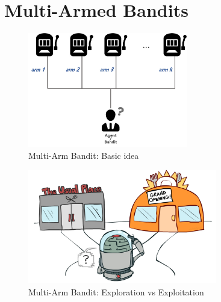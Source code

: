 \chapter{Multi-Armed Bandits \cite{medium-numsmt2-rl-ch2-part-1,umich-teneket-MAB,arxiv-1904.07272}}\label{Multi-Arm Bandits}

\begin{table}[H]
    \centering
    \begin{minipage}{0.45\linewidth}
        \begin{figure}[H]
            \centering
            \includegraphics[height=5cm]{Pictures/deep-reinforcement-learning/multi-arm-bandit-1.jpg}
            \caption{Multi-Arm Bandit: Basic idea}
        \end{figure}
    \end{minipage}
    \hfill
    \begin{minipage}{0.45\linewidth}
        \begin{figure}[H]
            \centering
            \includegraphics[height=5cm]{Pictures/deep-reinforcement-learning/multi-arm-bandit-2.jpg}
            \caption{Multi-Arm Bandit: Exploration vs Exploitation}
        \end{figure}
    \end{minipage}
\end{table}

